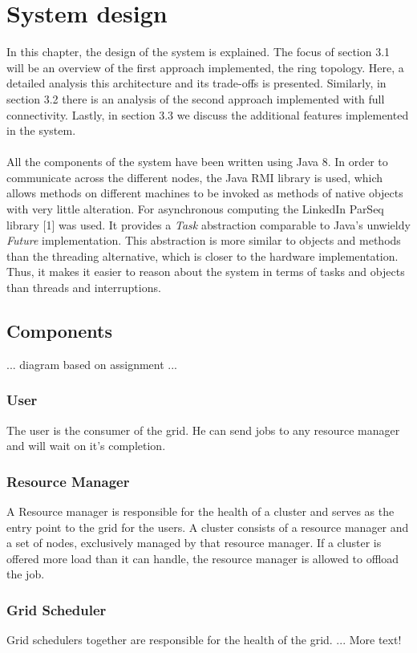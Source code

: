 \section{System design}
In this chapter, the design of the system is explained.
The focus of section 3.1 will be an overview of the first approach implemented, the ring topology. Here, a detailed analysis this architecture and its trade-offs is presented. Similarly, in section 3.2 there is an analysis of the second approach implemented with full connectivity. Lastly, in section 3.3 we discuss the additional features implemented in the system. \\\\
All the components of the system have been written using Java 8. In order to communicate across the different nodes, the Java RMI library is used, which
allows methods on different machines to be invoked as methods
of native objects with very little alteration.
For asynchronous computing the LinkedIn ParSeq library [1] was used.
It provides a \textit{Task} abstraction comparable to Java's
unwieldy \textit{Future} implementation.
This abstraction is more similar to objects and methods than the threading
alternative, which is closer to the hardware implementation.
Thus, it makes it easier to reason about the system in terms of tasks and objects than threads and interruptions.

\subsection{Components}

... diagram based on assignment ...
\subsubsection{User}
The user is the consumer of the grid.
He can send jobs to any resource manager and will wait on it's completion.

\subsubsection{Resource Manager}
A Resource manager is responsible for the health of a cluster and serves as the entry point to the grid for the users.
A cluster consists of a resource manager and a set of nodes, exclusively managed by that resource manager.
If a cluster is offered more load than it can handle, the resource manager is allowed to offload the job.

\subsubsection{Grid Scheduler}
Grid schedulers together are responsible for the health of the grid.
... More text!

